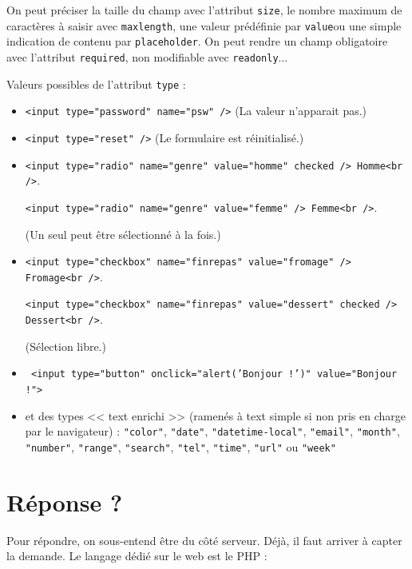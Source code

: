 On peut préciser la taille du champ avec l'attribut \texttt{size}, le nombre maximum de caractères à saisir avec  \texttt{maxlength}, une valeur prédéfinie par  \texttt{value}ou une simple indication de contenu par  \texttt{placeholder}. On peut rendre un champ obligatoire avec l'attribut \texttt{required}, non modifiable avec \texttt{readonly}...

Valeurs possibles de l'attribut \texttt{type} :

\begin{itemize}
	\item \texttt{<input type="password" name="psw" />} (La valeur n'apparait pas.)
	\item \texttt{<input type="reset" />} (Le formulaire est réinitialisé.)
	\item \texttt{<input type="radio" name="genre" value="homme" checked /> Homme<br />}.
	
	      \texttt{<input type="radio" name="genre" value="femme" /> Femme<br />}.
	      
	      (Un seul peut être sélectionné à la fois.)
	\item \texttt{<input type="checkbox" name="finrepas" value="fromage" /> Fromage<br />}.
	
	      \texttt{<input type="checkbox" name="finrepas" value="dessert" checked /> Dessert<br />}.
	      
	      (Sélection libre.)
	\item \texttt{ <input type="button" onclick="alert('Bonjour !')" value="Bonjour !"> } 
	\item et des types << text enrichi >> (ramenés à text simple si non pris en charge par le navigateur) : \texttt{"color"}, \texttt{"date"}, \texttt{"datetime-local"}, \texttt{"email"}, \texttt{"month"}, \texttt{"number"}, \texttt{"range"}, \texttt{"search"}, \texttt{"tel"}, \texttt{"time"}, \texttt{"url"} ou \texttt{"week"}

\end{itemize}

\section{Réponse ?}

Pour répondre, on sous-entend être du côté serveur. Déjà, il faut arriver à capter la demande. Le langage dédié sur le web est le PHP : 


